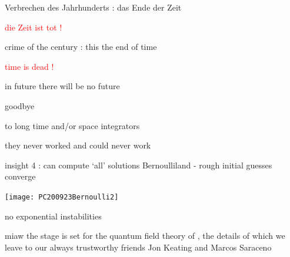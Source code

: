 \begin{frame}{Verbrechen des Jahrhunderts : das Ende der Zeit}
\begin{center}
\textcolor{red}{{\huge {\huge die Zeit ist tot} !}}
\end{center}
\end{frame} %

\begin{frame}{crime of the century : this the end of time}
\begin{center}
\textcolor{red}{{\huge time is dead !}}
\end{center}
\end{frame} %

\begin{frame}{in future there will be no future}
\begin{center}
{\huge goodbye}
\end{center}

\vfill

to long time and/or space integrators

\medskip

\hfill they never worked and could never work
\end{frame} %

\begin{frame}{insight 4 : can compute `all' solutions}
Bernoulliland - rough initial guesses converge
\begin{center}
\hfill\texttt{[image: PC200923Bernoulli2]}
\end{center}
no exponential instabilities
\end{frame} %

\begin{frame}{miaw}
\vfill
the stage is set for the quantum field theory of \catlatt, the details of
which we leave to our always trustworthy
friends Jon Keating and Marcos Saraceno
\end{frame} %






